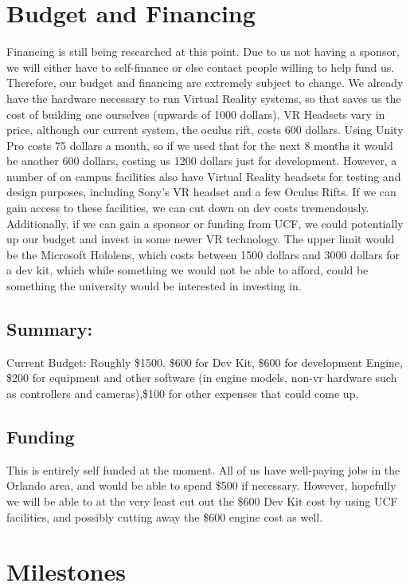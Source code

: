 \documentclass[a4paper,10pt]{article}
\begin{document}
	\section{Budget and Financing}
	                    Financing is still being researched at this point.  Due to us not having a sponsor, we will either have to self-finance or else contact people willing to help
	                    fund us.  Therefore, our budget and financing are extremely subject to change. 
	                    We already have the hardware necessary to run Virtual Reality systems, so that saves us the cost of building one ourselves (upwards of 1000 dollars). 
	                    VR Headsets vary in price, although our current system, the oculus rift, costs 600 dollars.  Using Unity Pro costs 75 dollars a month, so if we used that for 
	                    the next 8 months it would be another 600 dollars, costing us 1200 dollars just for development.  However, a number of on campus facilities also have Virtual 
	                    Reality headsets for testing and design purposes, including Sony’s VR headset and a few Oculus Rifts.  If we can gain access to these facilities, we can cut 
	                    down on dev costs tremendously.  Additionally, if we can gain a sponsor or funding from UCF, we could potentially up our budget and invest in some newer VR 
	                    technology.  The upper limit would be the Microsoft Hololens, which costs between 1500 dollars and 3000 dollars for a dev kit, which while something we would 
	                    not be able to afford, could be something the university would be interested in investing in.  
	                    
	                    \subsection{Summary:}
	                    Current Budget: Roughly \$1500.  \$600 for Dev Kit,
	                    \$600 for development Engine, \$200 for equipment and other software (in engine models, non-vr hardware such as controllers and cameras),\$100 for other
	                    expenses that could come up.
	                    
	                    \subsection{Funding}
	                    This is entirely self funded at the moment.  All of us have well-paying jobs in the 
	                    Orlando area, and would be able to spend \$500 if necessary.  However, hopefully we will be able to at the very least cut out the 
	                    \$600 Dev Kit cost by using UCF facilities, and possibly cutting away the \$600 engine cost as well.  
	\section{Milestones}
\end{document}
